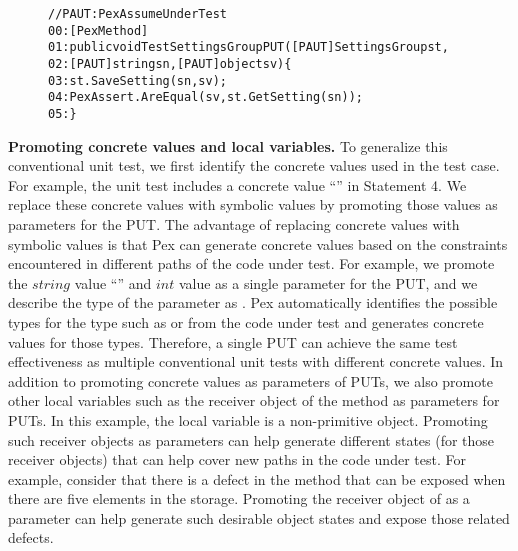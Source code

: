 \begin{figure}[t]
\begin{CodeOut}
\begin{alltt}
//PAUT: PexAssumeUnderTest
00:[PexMethod]
01:public void TestSettingsGroupPUT([PAUT] SettingsGroup st, 
02:\hspace*{0.1in}[PAUT] string sn, [PAUT] object sv) \{
03:\hspace*{0.2in}st.SaveSetting(sn, sv);
04:\hspace*{0.2in}PexAssert.AreEqual(sv, st.GetSetting(sn));
05:\}
\end{alltt}
\end{CodeOut}
\end{figure}

\textbf{Promoting concrete values and local variables.} 
To generalize this conventional unit test, we first identify the concrete values used in the test case. For example, the unit test includes a concrete  value ``'' in Statement 4. We replace these concrete values with symbolic values by promoting those values as parameters for the PUT. The advantage of replacing concrete values with symbolic values is that Pex can generate concrete values based on the constraints encountered in different paths of the code under test. For example, we promote the $string$ value ``'' and $int$ value  as a single parameter for the PUT, and we describe the type of the parameter as . Pex automatically identifies the possible types for the  type such as  or  from the code under test and generates concrete values for those types. Therefore, a single PUT can achieve the same test effectiveness as multiple conventional unit tests with different concrete values. In addition to promoting concrete values as parameters of PUTs, we also promote other local variables such as the receiver object of the  method as parameters for PUTs. In this example, the local variable  is a non-primitive object. Promoting such receiver objects as parameters can help generate different states (for those receiver objects) that can help cover new paths in the code under test. For example, consider that there is a defect in the  method that can be exposed when there are five elements in the storage. Promoting the receiver object of  as a parameter can help generate such desirable object states and expose those related defects. 

